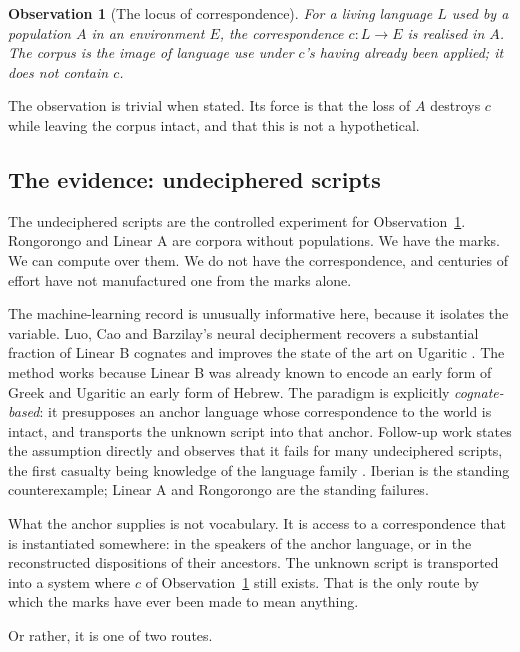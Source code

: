 \documentclass[11pt,a4paper]{article}
\theoremstyle{definition}
\theoremstyle{plain}
\newtheorem{observation}[definition]{Observation}
\theoremstyle{remark}
\begin{document}
\begin{observation}[The locus of correspondence]
\label{obs:locus}
For a living language $L$ used by a population $A$ in an environment $E$, the
correspondence $c : L \to E$ is realised in $A$. The corpus is the image of
language use under $c$'s having already been applied; it does not contain $c$.
\end{observation}

\noindent The observation is trivial when stated. Its force is that the loss of $A$
destroys $c$ while leaving the corpus intact, and that this is not a hypothetical.

\subsection{The evidence: undeciphered scripts}
\label{sec:decipherment}

The undeciphered scripts are the controlled experiment for
Observation~\ref{obs:locus}. Rongorongo and Linear A are corpora without populations. We
have the marks. We can compute over them. We do not have the correspondence, and
centuries of effort have not manufactured one from the marks alone.

The machine-learning record is unusually informative here, because it isolates the
variable. Luo, Cao and Barzilay's neural decipherment recovers a substantial fraction of
Linear B cognates and improves the state of the art on Ugaritic \cite{luo2019}. The
method works because Linear B was already known to encode an early form of Greek and
Ugaritic an early form of Hebrew. The paradigm is explicitly \emph{cognate-based}: it
presupposes an anchor language whose correspondence to the world is intact, and
transports the unknown script into that anchor. Follow-up work states the assumption
directly and observes that it fails for many undeciphered scripts, the first casualty
being knowledge of the language family \cite{luo2021}. Iberian is the standing
counterexample; Linear A and Rongorongo are the standing failures.

\noindent What the anchor supplies is not vocabulary. It is access to a correspondence
that is instantiated somewhere: in the speakers of the anchor language, or in the
reconstructed dispositions of their ancestors. The unknown script is transported into a
system where $c$ of Observation~\ref{obs:locus} still exists. That is the only route by
which the marks have ever been made to mean anything.

Or rather, it is one of two routes.
\end{document}
